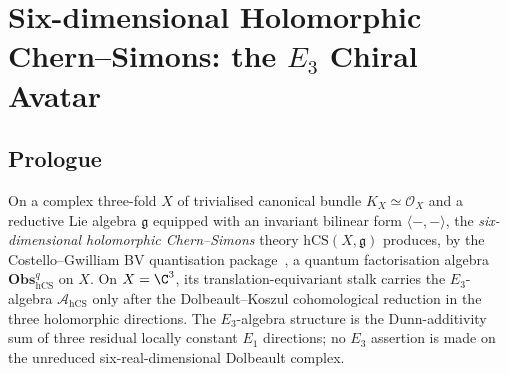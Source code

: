 
\providecommand{\SCchtop}{\mathsf{SC}^{\mathrm{ch},\mathrm{top}}}
\providecommand{\hCS}{\mathrm{hCS}}
\providecommand{\Obs}{\mathsf{Obs}}
\providecommand{\cA}{\mathcal{A}}
\providecommand{\cE}{\mathcal{E}}
\providecommand{\cF}{\mathcal{F}}
\providecommand{\cL}{\mathcal{L}}
\providecommand{\cO}{\mathcal{O}}
\providecommand{\fg}{\mathfrak{g}}
\providecommand{\ff}{\mathfrak{f}}
\providecommand{\fh}{\mathfrak{h}}
\providecommand{\fL}{\mathfrak{L}}
\providecommand{\dbar}{\bar\partial}
\providecommand{\CE}{\mathrm{CE}}
\providecommand{\MC}{\mathrm{MC}}
\providecommand{\QME}{\mathrm{QME}}
\providecommand{\Sym}{\mathrm{Sym}}
\providecommand{\id}{\mathrm{id}}
\providecommand{\Ran}{\mathrm{Ran}}
\providecommand{\Tr}{\mathrm{Tr}}
\providecommand{\Fact}{\mathrm{Fact}}
\providecommand{\Ch}{\mathrm{Ch}}
\providecommand{\End}{\mathrm{End}}
\providecommand{\Conf}{\mathrm{Conf}}
\providecommand{\Lie}{\mathsf{Lie}}
\providecommand{\Ass}{\mathsf{Ass}}
\providecommand{\HolFA}{\mathrm{HolFA}}
\providecommand{\EdHolFA}{E_d\text{-}\HolFA}
\providecommand{\EnHolFA}{E_n\text{-}\HolFA}
\providecommand{\Ainf}{A_\infty}
\providecommand{\Linf}{L_\infty}
\providecommand{\KT}{\mathrm{KT}}
\providecommand{\BV}{\mathrm{BV}}
\providecommand{\BRST}{\mathrm{BRST}}
\providecommand{\Fobs}{\mathbf{Obs}}
\providecommand{\Omegabar}{\Omega^{0,\bullet}}

\chapter{Six-dimensional Holomorphic Chern--Simons: the $E_3$ Chiral Avatar}
\label{ch:six-d-hcs-e3-chiral-avatar-platonic}

\section*{Prologue}

On a complex three-fold $X$ of trivialised canonical bundle
$K_X\simeq\cO_X$ and a reductive Lie algebra $\fg$ equipped with an
invariant bilinear form $\langle-,-\rangle$, the \emph{six-dimensional
holomorphic Chern--Simons} theory $\hCS(X,\fg)$ produces, by the
Costello--Gwilliam BV quantisation
package~\cite{CostelloRenormalization,CostelloGwilliam2017,CostelloGwilliam2021},
a quantum factorisation algebra $\Fobs^{q}_{\hCS}$ on $X$.
On $X = \C^3$, its translation-equivariant stalk carries the
$E_3$-algebra $\cA_{\hCS}$ only after the
Dolbeault--Koszul cohomological reduction in the three holomorphic
directions. The $E_3$-algebra structure is the Dunn-additivity sum of
three residual locally constant $E_1$ directions; no $E_3$ assertion is
made on the unreduced six-real-dimensional Dolbeault complex.

